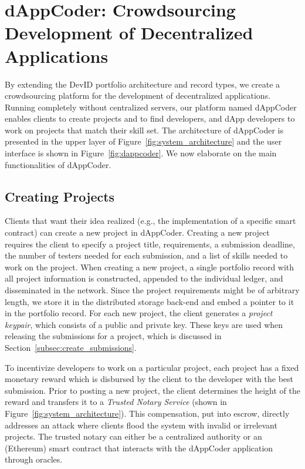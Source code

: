 \section{dAppCoder: Crowdsourcing Development of Decentralized Applications}
\label{sec:dappcoder}
By extending the DevID portfolio architecture and record types, we create a crowdsourcing platform for the development of decentralized applications.
Running completely without centralized servers, our platform named dAppCoder enables clients to create projects and to find developers, and dApp developers to work on projects that match their skill set.
The architecture of dAppCoder is presented in the upper layer of Figure~\ref{fig:system_architecture} and the user interface is shown in Figure~\ref{fig:dappcoder}.
We now elaborate on the main functionalities of dAppCoder.

\subsection{Creating Projects}
Clients that want their idea realized (e.g., the implementation of a specific smart contract) can create a new project in dAppCoder.
Creating a new project requires the client to specify a project title, requirements, a submission deadline, the number of testers needed for each submission, and a list of skills needed to work on the project.
When creating a new project, a single portfolio record with all project information is constructed, appended to the individual ledger, and disseminated in the network.
Since the project requirements might be of arbitrary length, we store it in the distributed storage back-end and embed a pointer to it in the portfolio record.
For each new project, the client generates a \textit{project keypair}, which consists of a public and private key.
These keys are used when releasing the submissions for a project, which is discussed in Section~\ref{subsec:create_submissions}.

To incentivize developers to work on a particular project, each project has a fixed monetary reward which is disbursed by the client to the developer with the best submission.
Prior to posting a new project, the client determines the height of the reward and transfers it to a \textit{Trusted Notary Service} (shown in Figure~\ref{fig:system_architecture}).
This compensation, put into escrow, directly addresses an attack where clients flood the system with invalid or irrelevant projects.
The trusted notary can either be a centralized authority or an (Ethereum) smart contract that interacts with the dAppCoder application through oracles.

